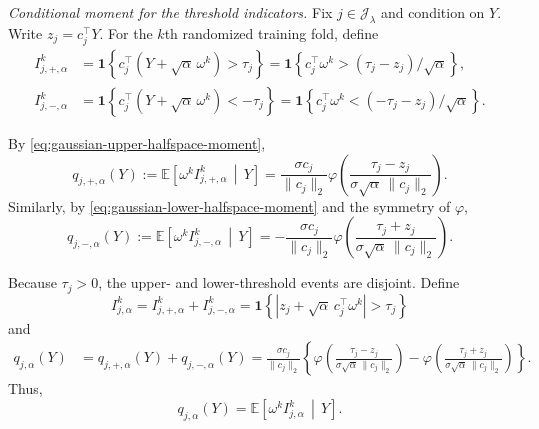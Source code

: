 \documentclass[12pt]{article}
\newcommand{\tran}{^\intercal}
\newcommand{\Indc}[1]{{\mathbf{1}\left\{{#1}\right\}}}
\theoremstyle{general}
\begin{document}
\medskip\noindent
\emph{Conditional moment for the threshold indicators.}
Fix \(j\in\mathcal J_{\lambda}\) and condition on \(Y\). Write
$z_j=c_j\tran Y$.
For the \(k\)th randomized training fold, define
\begin{align*}
I_{j,+,\alpha}^k
&=
\Indc{
c_j\tran(Y+\sqrt\alpha\,\omega^k)>\tau_j
}
=
\Indc{
c_j\tran\omega^k>
(\tau_j-z_j)/\sqrt\alpha
},
\\
I_{j,-,\alpha}^k
&=
\Indc{
c_j\tran(Y+\sqrt\alpha\,\omega^k)<-\tau_j
}
=
\Indc{
c_j\tran\omega^k<
(-\tau_j-z_j)/\sqrt\alpha
}.
\end{align*}

By \eqref{eq:gaussian-upper-halfspace-moment},
\begin{equation*}
q_{j,+,\alpha}(Y)
:=
\mathbb E\!\left[
\omega^k I_{j,+,\alpha}^k
\,\middle|\,
Y
\right]
=
\frac{\sigma c_j}{\|c_j\|_2}
\varphi\!\left(
\frac{\tau_j-z_j}
{\sigma\sqrt\alpha\,\|c_j\|_2}
\right).
\end{equation*}
Similarly, by \eqref{eq:gaussian-lower-halfspace-moment} and the
symmetry of \(\varphi\),
\begin{equation*}
q_{j,-,\alpha}(Y)
:=
\mathbb E\!\left[
\omega^k I_{j,-,\alpha}^k
\,\middle|\,
Y
\right]
=
-\frac{\sigma c_j}{\|c_j\|_2}
\varphi\!\left(
\frac{\tau_j+z_j}
{\sigma\sqrt\alpha\,\|c_j\|_2}
\right).
\end{equation*}

Because \(\tau_j>0\), the upper- and lower-threshold events are
disjoint. Define
\begin{equation*}
I_{j,\alpha}^k
=
I_{j,+,\alpha}^k+I_{j,-,\alpha}^k
=
\Indc{
|z_j+\sqrt\alpha\,c_j\tran\omega^k|>\tau_j
}
\end{equation*}
and
\begin{align*}
q_{j,\alpha}(Y)
&=
q_{j,+,\alpha}(Y)+q_{j,-,\alpha}(Y)
=
\frac{\sigma c_j}{\|c_j\|_2}
\left\{
\varphi\!\left(
\frac{\tau_j-z_j}
{\sigma\sqrt\alpha\,\|c_j\|_2}
\right)
-
\varphi\!\left(
\frac{\tau_j+z_j}
{\sigma\sqrt\alpha\,\|c_j\|_2}
\right)
\right\}.
\end{align*}
Thus,
\begin{equation}
\label{eq:hard-threshold-q-identity}
q_{j,\alpha}(Y)
=
\mathbb E\!\left[
\omega^k I_{j,\alpha}^k
\,\middle|\,
Y
\right].
\end{equation}
\end{document}
